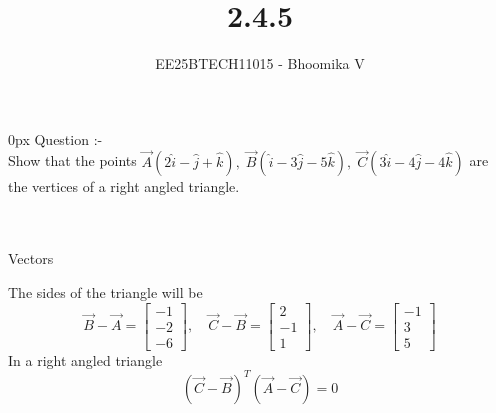 \documentclass[journal]{IEEEtran}
\begin{document}

\vspace{3cm}

\title{2.4.5}
\author{EE25BTECH11015 - Bhoomika V}
{\let\newpage\relax\maketitle}

\renewcommand{\thefigure}{\theenumi}
\renewcommand{\thetable}{\theenumi}
\setlength{\intextsep}{10pt} %


\renewcommand{\thetable}{\theenumi}
\parindent 0px 
{Question :-} \\ 

Show that the points 
$\vec{A}(2\hat{i} - \hat{j} + \hat{k}),\;
\vec{B}(\hat{i} - 3\hat{j} - 5\hat{k}),\;
\vec{C}(3\hat{i} - 4\hat{j} - 4\hat{k})$
are the vertices of a right angled triangle. \\ \\

\solution \\

\begin{table}[H]    
  \centering
  
  \caption{Vectors}
  \label{Answers}
\end{table}


The sides of the triangle will be 
\begin{equation}
\vec{B}-\vec{A} = 
\begin{bmatrix}
-1 \\ 
-2 \\ 
-6
\end{bmatrix}, \quad
\vec{C}-\vec{B} = 
\begin{bmatrix}
2 \\ 
-1 \\ 
1
\end{bmatrix}, \quad
\vec{A}-\vec{C} = 
\begin{bmatrix}
-1 \\ 
3 \\ 
5
\end{bmatrix}
\label{1}
\end{equation}
 In a right angled triangle 
\begin{equation}
(\vec{C}-\vec{B})^{T} (\vec{A}-\vec{C}) = 0
\label{2}
\end{equation}
\end{document}
